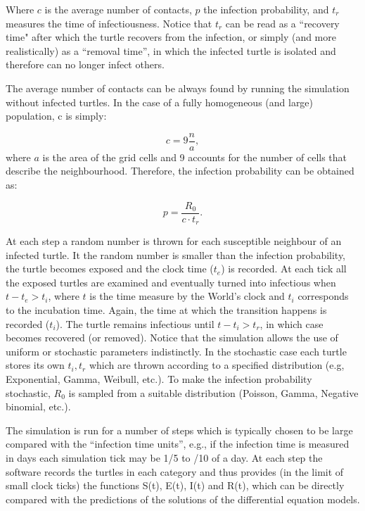 \documentclass[a4paper,oneside,11pt]{article}
\begin{document}
Where $c$ is the average number of contacts, $p$ the infection probability, and $t_r$ measures the time of infectiousness. Notice that $t_r$ can be read as a ``recovery time" after which the turtle recovers from the infection, or simply (and more realistically) as a ``removal time'', in which the infected turtle is isolated and therefore can no longer infect others.

The average number of contacts can be always found by running the simulation without infected turtles. In the case of a fully homogeneous (and large) population, c is simply:

\begin{equation}
c = 9 \frac{n}{a},
\end{equation}
%
where $a$ is the area of the grid cells and 9 accounts for the number of cells that describe the neighbourhood. Therefore, the infection probability can be obtained as:

\begin{equation}
p = \frac{R_0}{c \cdot t_r}.
\end{equation}

At each step a random number is thrown for each susceptible neighbour of an infected turtle. It the random number is smaller than the infection probability, the turtle becomes exposed and the clock time ($t_e$) is recorded. At each tick all the exposed turtles are examined and eventually turned into infectious when
$t - t_e > t_i$, where $t$ is the time measure by the World's clock and $t_i$ corresponds to the incubation time. Again, the time at which the transition happens is recorded ($t_i$). The turtle remains infectious until $t - t_i > t_r$, in which case becomes recovered (or removed).
Notice that the simulation allows the use of uniform or stochastic parameters indistinctly. In the stochastic case each turtle stores its own $t_i, t_r$ which are thrown according to a specified distribution (e.g, Exponential, Gamma, Weibull, etc.). To make the infection probability stochastic, $R_0$ is sampled from a suitable distribution (Poisson, Gamma, Negative binomial, etc.).

The simulation is run for a number of steps which is typically chosen to be large compared with the ``infection time units'', e.g., if the infection time is measured in days each simulation tick may be 1/5 to /10 of a day. At each step the software records the turtles in each category and thus provides (in the limit of small clock ticks) the functions S(t), E(t), I(t) and R(t), which can be directly compared with the predictions of the solutions of the differential equation models.
\end{document}
